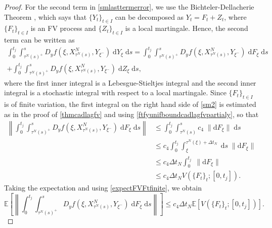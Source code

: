 \documentclass[reqno,12pt]{amsart}
\theoremstyle{plain} %
\theoremstyle{definition} %
\begin{document}
\begin{proof}
    For the second term in \eqref{smlasttermerror}, we use the Bichteler-Dellacherie Theorem \cite[Theorem III.47]{Protter2005}, which says that $\{Y_t\}_{t\in I}$ can be decomposed as $Y_t = F_t + Z_t$, where $\{F_t\}_{t\in I}$ is an FV process and $\{Z_t\}_{t\in I}$ is a local martingale. Hence, the second term can be written as
    \begin{multline}
        \label{sm2}
        \int_0^{t_j} \int_{\tau^N(s)^+}^s D_y f(\xi, X_{\tau^N(s)}^N, Y_{\xi^-}) \;\mathrm{d}Y_\xi \;\mathrm{d}s = \int_0^{t_j} \int_{\tau^N(s)^+}^s D_y f(\xi, X_{\tau^N(s)}^N, Y_{\xi^-}) \;\mathrm{d}F_\xi \;\mathrm{d}s \\  
        + \int_0^{t_j} \int_{\tau^N(s)^+}^s D_y f(\xi, X_{\tau^N(s)}^N, Y_{\xi^-}) \;\mathrm{d}Z_\xi \;\mathrm{d}s,
    \end{multline}
    where the first inner integral is a Lebesgue-Stieltjes integral and the second inner integral is a stochastic integral with respect to a local martingale. Since $\{F_t\}_{t\in I}$ is of finite variation, the first integral on the right hand side of \eqref{sm2} is estimated as in the proof of \cref{thmcadlagfv} and using \eqref{ftfyunifboundcadlagfvpartialy}, so that
    \begin{align*}
        \left\|\int_0^{t_j} \int_{\tau^N(s)^+}^s D_y f(\xi, X_{\tau^N(s)}^N, Y_{\xi^-}) \;\mathrm{d}F_\xi\;\mathrm{d}s\right\| & \leq \int_0^{t_j} \int_{\tau^N(s)}^s c_4\;\|\mathrm{d}F_\xi\|\;\mathrm{d}s \\
        & \leq c_4\int_0^{t_j} \int_{\xi}^{\tau^N(\xi) + \Delta t_N} \;\mathrm{d}s\;\|\mathrm{d}F_\xi\| \\
        & \leq c_4\Delta t_N\int_0^{t_j} \;\|\mathrm{d}F_\xi\| \\
        & \leq c_4\Delta t_N V(\{F_t\}_t; [0, t_j]).
    \end{align*}
    Taking the expectation and using \eqref{expectFVFtfinite}, we obtain
    \begin{equation*}
        \mathbb{E}\left[\left\|\int_0^{t_j} \int_{\tau^N(s)^+}^s D_y f(\xi, X_{\tau^N(s)}^N, Y_{\xi^-}) \;\mathrm{d}F_\xi\;\mathrm{d}s\right\|\right] \leq c_4 \Delta t_N \mathbb{E}\left[ V(\{F_t\}_t; [0, t_j]) \right].
    \end{equation*}
    

\end{proof}
\end{document}
